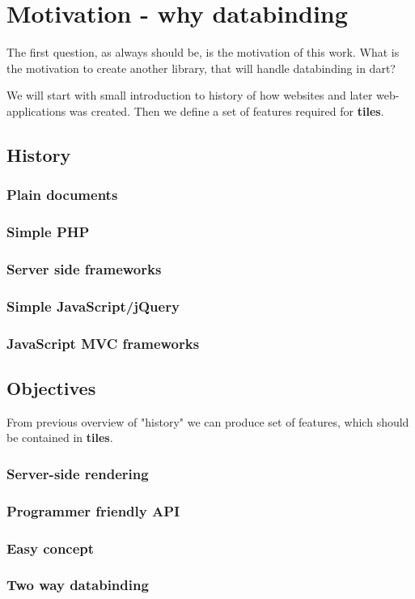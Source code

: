 \chapter{Motivation - why databinding}\label{chap:motivatio}

The first question, as always should be, is the motivation of this work. 
What is the motivation to create another library, that will handle databinding in dart?

We will start with small introduction to history of how websites and later web-applications was created. 
Then we define a set of features required for \textbf{tiles}.

\section{History}\label{sec:history}
\subsection{Plain documents}\label{subsec:history-plain-doc}
\subsection{Simple PHP}\label{subsec:history-server-side-scripts}
\subsection{Server side frameworks}\label{subsec:history-server-side-frameworks}
\subsection{Simple JavaScript/jQuery}\label{subsec:history-jquery}
\subsection{JavaScript MVC frameworks}\label{subsec:history-js-mvc}


\section{Objectives}\label{sec:objectives}

From previous overview of "history" we can produce set of features, 
which should be contained in \textbf{tiles}.

\subsection{Server-side rendering}\label{subsec:objectives-server-side-rendering}
\subsection{Programmer friendly API}\label{subsec:objectives-friendly-api}
\subsection{Easy concept}\label{subsec:objectives-easy-concept}
\subsection{Two way databinding}\label{subsec:objectives-two-way-databinding}
